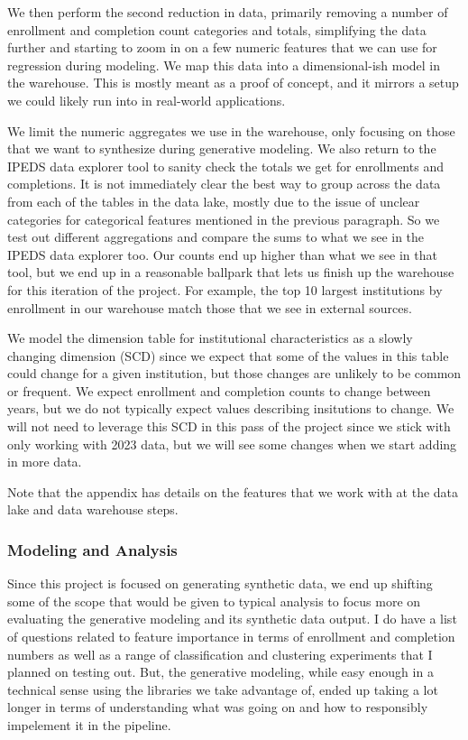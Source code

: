 \documentclass[sigconf, authorversion, nonacm]{acmart}
\begin{document}
        We then perform the second reduction in data, primarily removing a number of enrollment and completion count categories and totals, simplifying the data further and starting to zoom in on a few numeric features that we can use for regression during modeling. We map this data into a dimensional-ish model in the warehouse. This is mostly meant as a proof of concept, and it mirrors a setup we could likely run into in real-world applications.

        We limit the numeric aggregates we use in the warehouse, only focusing on those that we want to synthesize during generative modeling. We also return to the IPEDS data explorer tool to sanity check the totals we get for enrollments and completions. It is not immediately clear the best way to group across the data from each of the tables in the data lake, mostly due to the issue of unclear categories for categorical features mentioned in the previous paragraph. So we test out different aggregations and compare the sums to what we see in the IPEDS data explorer too. Our counts end up higher than what we see in that tool, but we end up in a reasonable ballpark that lets us finish up the warehouse for this iteration of the project. For example, the top 10 largest institutions by enrollment in our warehouse match those that we see in external sources.

        We model the dimension table for institutional characteristics as a slowly changing dimension (SCD) since we expect that some of the values in this table could change for a given institution, but those changes are unlikely to be common or frequent. We expect enrollment and completion counts to change between years, but we do not typically expect values describing insitutions to change. We will not need to leverage this SCD in this pass of the project since we stick with only working with 2023 data, but we will see some changes when we start adding in more data.

        Note that the appendix has details on the features that we work with at the data lake and data warehouse steps.

    \subsubsection{Modeling and Analysis}
        Since this project is focused on generating synthetic data, we end up shifting some of the scope that would be given to typical analysis to focus more on evaluating the generative modeling and its synthetic data output. I do have a list of questions related to feature importance in terms of enrollment and completion numbers as well as a range of classification and clustering experiments that I planned on testing out. But, the generative modeling, while easy enough in a technical sense using the libraries we take advantage of, ended up taking a lot longer in terms of understanding what was going on and how to responsibly impelement it in the pipeline.
\end{document}
